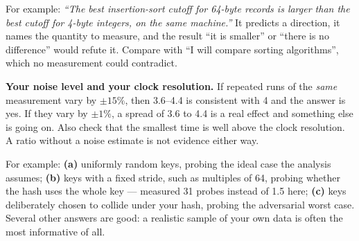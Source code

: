 \begin{ans}
  \item For example: \emph{``The best insertion-sort cutoff for 64-byte records
        is larger than the best cutoff for 4-byte integers, on the same
        machine.''} It predicts a direction, it names the quantity to measure,
        and the result ``it is smaller'' or ``there is no difference'' would
        refute it. Compare with ``I will compare sorting algorithms'', which no
        measurement could contradict.
  \item \textbf{Your noise level and your clock resolution.} If repeated runs of
        the \emph{same} measurement vary by $\pm 15\%$, then 3.6--4.4 is
        consistent with 4 and the answer is yes. If they vary by $\pm 1\%$,
        a spread of 3.6 to 4.4 is a real effect and something else is going on.
        Also check that the smallest time is well above the clock resolution.
        A ratio without a noise estimate is not evidence either way.
  \item For example: \textbf{(a)} uniformly random keys, probing the ideal
        case the analysis assumes; \textbf{(b)} keys with a fixed stride, such
        as multiples of 64, probing whether the hash uses the whole key ---
         measured 31 probes instead of 1.5 here; \textbf{(c)}
        keys deliberately chosen to collide under your hash, probing the
        adversarial worst case. Several other answers are good: a realistic
        sample of your own data is often the most informative of all.
\end{ans}
